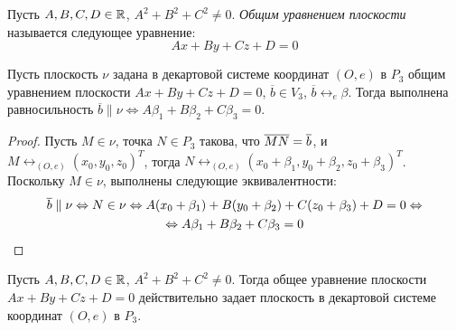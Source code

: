\begin{definition}
	Пусть $A, B, C, D \in \mathbb{R}$, $A^2+B^2+C^2 \ne 0$. \textit{Общим уравнением плоскости} называется следующее уравнение:
	\[Ax + By + Cz + D = 0\]
\end{definition}

\begin{proposition}
	Пусть плоскость $\nu$ задана в декартовой системе координат $(O, e)$ в $P_3$ общим уравнением плоскости $Ax+By+Cz+D=0$, $\overline{b} \in V_3$, $\overline{b} \leftrightarrow_{e} \beta$. Тогда выполнена равносильность $\overline{b} \parallel \nu \Leftrightarrow A\beta_1 + B\beta_2 + C\beta_3 = 0$.
\end{proposition}

\begin{proof}
	Пусть $M \in \nu$, точка $N \in P_3$ такова, что $\overline{MN} \hm{=} \overline{b}$, и $M \leftrightarrow_{(O, e)} (x_0, y_0, z_0)^T$, тогда $N \leftrightarrow_{(O, e)} (x_0 + \beta_1, y_0 + \beta_2, z_0 + \beta_3)^T$. Поскольку $M \in \nu$, выполнены следующие эквивалентности:
	\begin{multline*}
		\overline{b} \parallel \nu \Leftrightarrow N \in \nu \Leftrightarrow A(x_0 + \beta_1) + B(y_0 + \beta_2) + C(z_0 + \beta_3) + D = 0 \Leftrightarrow
		\\
		\Leftrightarrow A\beta_1 + B\beta_2 + C\beta_3 = 0\qedhere
	\end{multline*}
\end{proof}

\begin{proposition}
	Пусть $A, B, C, D \in \mathbb{R}$, $A^2+B^2+C^2 \ne 0$. Тогда общее уравнение плоскости $Ax+By+Cz+D=0$ действительно задает плоскость в декартовой системе координат $(O, e)$ в $P_3$.
\end{proposition}


